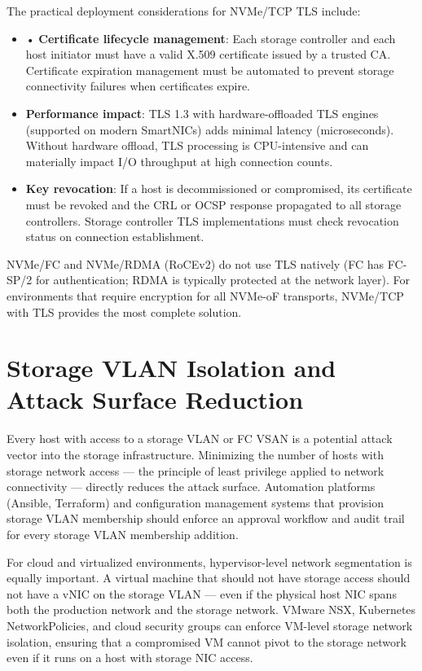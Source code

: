 The practical deployment considerations for NVMe/TCP TLS include:

\begin{itemize}
  \item • \textbf{Certificate lifecycle management}: Each storage controller and each host initiator must have a valid X.509 certificate issued by a trusted CA. Certificate expiration management must be automated to prevent storage connectivity failures when certificates expire.
  \item \textbf{Performance impact}: TLS 1.3 with hardware-offloaded TLS engines (supported on modern SmartNICs) adds minimal latency (microseconds). Without hardware offload, TLS processing is CPU-intensive and can materially impact I/O throughput at high connection counts.
  \item \textbf{Key revocation}: If a host is decommissioned or compromised, its certificate must be revoked and the CRL or OCSP response propagated to all storage controllers. Storage controller TLS implementations must check revocation status on connection establishment.
\end{itemize}

NVMe/FC and NVMe/RDMA (RoCEv2) do not use TLS natively (FC has FC-SP/2 for authentication; RDMA is typically protected at the network layer). For environments that require encryption for all NVMe-oF transports, NVMe/TCP with TLS provides the most complete solution.

\section{Storage VLAN Isolation and Attack Surface Reduction}
Every host with access to a storage VLAN or FC VSAN is a potential attack vector into the storage infrastructure. Minimizing the number of hosts with storage network access --- the principle of least privilege applied to network connectivity --- directly reduces the attack surface. Automation platforms (Ansible, Terraform) and configuration management systems that provision storage VLAN membership should enforce an approval workflow and audit trail for every storage VLAN membership addition.

For cloud and virtualized environments, hypervisor-level network segmentation is equally important. A virtual machine that should not have storage access should not have a vNIC on the storage VLAN --- even if the physical host NIC spans both the production network and the storage network. VMware NSX, Kubernetes NetworkPolicies, and cloud security groups can enforce VM-level storage network isolation, ensuring that a compromised VM cannot pivot to the storage network even if it runs on a host with storage NIC access.

